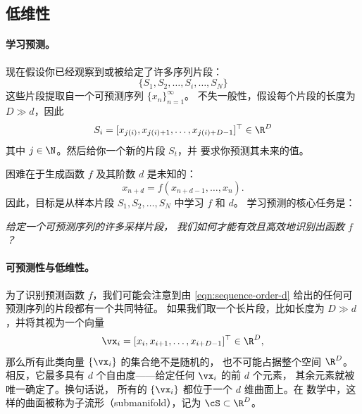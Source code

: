 \documentclass[../../book-main_zh.tex]{subfiles}
\begin{document}
\subsection{低维性}\label{sec:intro-low-dimensionality}
\paragraph{学习预测。}
现在假设你已经观察到或被给定了许多序列片段：
\begin{equation}
    \{S_{1}, S_{2}, \ldots, S_{i}, \ldots, S_{N}\}
\end{equation}
这些片段提取自一个可预测序列 \(\{x_{n}\}_{n=1}^{\infty}\)。
不失一般性，假设每个片段的长度为 \(D \gg d\)，因此
\begin{equation}
    S_{i} = [x_{j(i)}, x_{j(i)+1}, \ldots, x_{j(i)+D-1}]^{\top} \in \R^{D}
\end{equation}
其中 \(j \in \N\)。然后给你一个新的片段 \(S_{t}\)，并
要求你预测其未来的值。

困难在于生成函数 \(f\) 及其阶数 \(d\) 是未知的：
\begin{equation}
    x_{n+d} = f(x_{n+d-1}, \ldots, x_{n}).
    \label{eqn:sequence-order-d}
\end{equation}
因此，目标是从样本片段 \(S_{1}, S_{2}, \ldots, S_{N}\) 中学习 \(f\) 和 \(d\)。
学习预测的核心任务是：
\begin{center}
    \textit{给定一个可预测序列的许多采样片段，
    我们如何才能有效且高效地识别出函数 \(f\)？}
\end{center}

\paragraph{可预测性与低维性。}
为了识别预测函数 \(f\)，我们可能会注意到由 \eqref{eqn:sequence-order-d} 给出的任何可预测序列的片段都有一个共同特征。
如果我们取一个长片段，比如长度为 \(D \gg d\)，并将其视为一个向量
\begin{equation}
    \vx_{i} = [x_{i}, x_{i+1}, \ldots, x_{i+D-1}]^{\top} \in \R^{D},
    \label{eqn:segment-vector}
\end{equation}
那么所有此类向量 \(\{\vx_{i}\}\) 的集合绝不是随机的，
也不可能占据整个空间 \(\R^{D}\)。相反，它最多具有
\(d\) 个自由度——给定任何 \(\vx_{i}\) 的前 \(d\) 个元素，
其余元素就被唯一确定了。换句话说，
所有的 \(\{\vx_{i}\}\) 都位于一个 \(d\) 维曲面上。在
数学中，这样的曲面被称为子流形（submanifold），记为 \(\cS
\subset \R^{D}\)。
\end{document}
